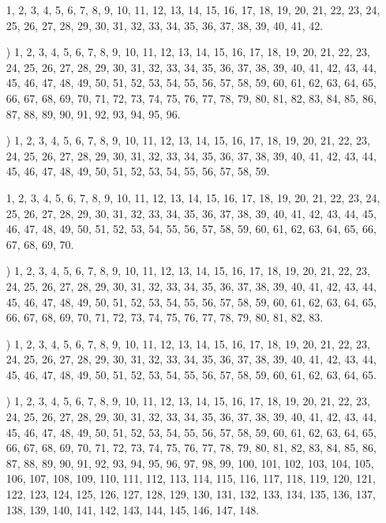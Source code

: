 \documentclass[a4paper,11pt]{article}
\numberwithin{equation}{section}
\begin{document}
\begin{itemize}

\item[\romannumeral1] 1, 2, 3, 4, 5, 6, 7, 8, 9, 10, 11, 12, 13, 14, 15, 16,
  17, 18, 19, 20, 21, 22, 23, 24, 25, 26, 27, 28, 29, 30, 31, 32, 33, 34,
  35, 36, 37, 38, 39, 40, 41, 42.

\item[\romannumeral2)] 1, 2, 3, 4, 5, 6, 7, 8, 9, 10, 11, 12, 13, 14, 15,
  16, 17, 18, 19, 20, 21, 22, 23, 24, 25, 26, 27, 28, 29, 30, 31, 32, 33,
  34, 35, 36, 37, 38, 39, 40, 41, 42, 43, 44, 45, 46, 47, 48, 49, 50, 51,
  52, 53, 54, 55, 56, 57, 58, 59, 60, 61, 62, 63, 64, 65, 66, 67, 68, 69,
  70, 71, 72, 73, 74, 75, 76, 77, 78, 79, 80, 81, 82, 83, 84, 85, 86, 87,
  88, 89, 90, 91, 92, 93, 94, 95, 96.

\item[\romannumeral3)] 1, 2, 3, 4, 5, 6, 7, 8, 9, 10, 11, 12, 13, 14, 15,
  16, 17, 18, 19, 20, 21, 22, 23, 24, 25, 26, 27, 28, 29, 30, 31, 32, 33,
  34, 35, 36, 37, 38, 39, 40, 41, 42, 43, 44, 45, 46, 47, 48, 49, 50, 51,
  52, 53, 54, 55, 56, 57, 58, 59.

\item[\romannumeral4] 1, 2, 3, 4, 5, 6, 7, 8, 9, 10, 11, 12, 13, 14, 15, 16,
  17, 18, 19, 20, 21, 22, 23, 24, 25, 26, 27, 28, 29, 30, 31, 32, 33, 34,
  35, 36, 37, 38, 39, 40, 41, 42, 43, 44, 45, 46, 47, 48, 49, 50, 51, 52,
  53, 54, 55, 56, 57, 58, 59, 60, 61, 62, 63, 64, 65, 66, 67, 68, 69, 70.

\item[\romannumeral5)] 1, 2, 3, 4, 5, 6, 7, 8, 9, 10, 11, 12, 13, 14, 15,
  16, 17, 18, 19, 20, 21, 22, 23, 24, 25, 26, 27, 28, 29, 30, 31, 32, 33,
  34, 35, 36, 37, 38, 39, 40, 41, 42, 43, 44, 45, 46, 47, 48, 49, 50, 51,
  52, 53, 54, 55, 56, 57, 58, 59, 60, 61, 62, 63, 64, 65, 66, 67, 68, 69,
  70, 71, 72, 73, 74, 75, 76, 77, 78, 79, 80, 81, 82, 83.

\item[\romannumeral6)] 1, 2, 3, 4, 5, 6, 7, 8, 9, 10, 11, 12, 13, 14, 15,
  16, 17, 18, 19, 20, 21, 22, 23, 24, 25, 26, 27, 28, 29, 30, 31, 32, 33,
  34, 35, 36, 37, 38, 39, 40, 41, 42, 43, 44, 45, 46, 47, 48, 49, 50, 51,
  52, 53, 54, 55, 56, 57, 58, 59, 60, 61, 62, 63, 64, 65.

\item[\romannumeral7)] 1, 2, 3, 4, 5, 6, 7, 8, 9, 10, 11, 12, 13, 14, 15,
  16, 17, 18, 19, 20, 21, 22, 23, 24, 25, 26, 27, 28, 29, 30, 31, 32, 33,
  34, 35, 36, 37, 38, 39, 40, 41, 42, 43, 44, 45, 46, 47, 48, 49, 50, 51,
  52, 53, 54, 55, 56, 57, 58, 59, 60, 61, 62, 63, 64, 65, 66, 67, 68, 69,
  70, 71, 72, 73, 74, 75, 76, 77, 78, 79, 80, 81, 82, 83, 84, 85, 86, 87,
  88, 89, 90, 91, 92, 93, 94, 95, 96, 97, 98, 99, 100, 101, 102, 103, 104,
  105, 106, 107, 108, 109, 110, 111, 112, 113, 114, 115, 116, 117, 118, 119,
  120, 121, 122, 123, 124, 125, 126, 127, 128, 129, 130, 131, 132, 133, 134,
  135, 136, 137, 138, 139, 140, 141, 142, 143, 144, 145, 146, 147, 148.


\end{itemize}
\end{document}
